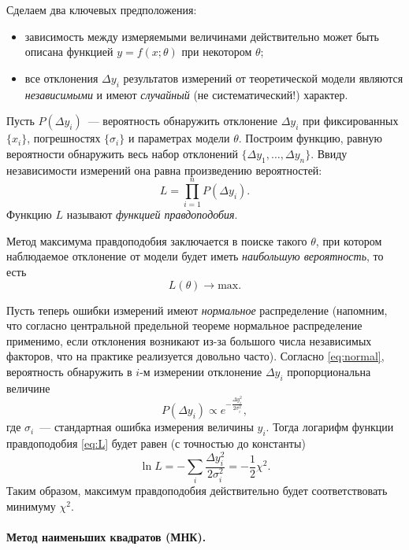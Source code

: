 Сделаем два ключевых предположения:
\begin{itemize}
 \item  зависимость между измеряемыми величинами действительно может
 быть описана функцией $y=f(x;\theta)$ при некотором $\theta$;
 \item все отклонения $\Delta y_i$ результатов измерений от теоретической модели
 являются \emph{независимыми} и имеют \emph{случайный} (не систематический!) характер.
\end{itemize}

Пусть $P(\Delta y_i)$~--- вероятность обнаружить отклонение $\Delta y_i$
при фиксированных $\{x_i\}$, погрешностях $\{\sigma_i\}$ и параметрах модели $\theta$.
Построим функцию, равную вероятности обнаружить
весь набор отклонений $\{\Delta y_1,\ldots,\Delta y_n\}$. Ввиду независимости
измерений она равна произведению вероятностей:
\begin{equation}\label{eq:L}
L =  \prod_{i=1}^n P(\Delta y_i).
\end{equation}
Функцию $L$ называют \emph{функцией правдоподобия}.

Метод максимума правдоподобия заключается в поиске такого $\theta$,
при котором наблюдаемое отклонение от модели будет иметь
\emph{наибольшую вероятность}, то есть
\[
L(\theta) \to \mathrm{max}.
\]

Пусть теперь ошибки измерений имеют \emph{нормальное} распределение
(напомним, что согласно центральной предельной теореме нормальное распределение
применимо, если отклонения возникают из-за большого
числа независимых факторов, что на практике реализуется довольно часто).
Согласно \eqref{eq:normal}, вероятность обнаружить в $i$-м измерении
отклонение $\Delta y_i$ пропорциональна величине
\[
P(\Delta y_i) \propto e^{-\frac{\Delta y_i^2}{2\sigma_i^2}},
\]
где $\sigma_i$~--- стандартная ошибка измерения величины $y_i$. Тогда
логарифм функции правдоподобия \eqref{eq:L} будет равен (с точностью до константы)
\[
 \ln L = - \sum_i \frac{\Delta y_i^2}{2\sigma_i^2} = - \frac12 \chi^2.
\]
Таким образом, максимум правдоподобия действительно будет соответствовать
минимуму $\chi^2$.

\paragraph{Метод наименьших квадратов (МНК).}

